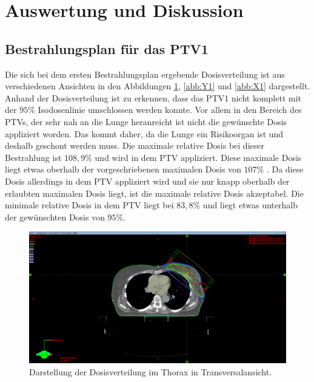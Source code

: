 \section{Auswertung und Diskussion}
\label{sec:Auswertung}

\subsection*{Bestrahlungsplan für das PTV1}

Die sich bei dem ersten Bestrahlungsplan ergebende Dosisverteilung ist aus verschiedenen
Ansichten in den Abbildungen \ref{abb:Z1}, \ref{abb:Y1} und \ref{abb:X1} dargestellt.
Anhand der Dosisverteilung ist zu erkennen, dass das PTV1 nicht komplett mit der $95\%$
Isodosenlinie umschlossen werden konnte. Vor allem in den Bereich des PTVs, der sehr nah an
die Lunge heranreicht ist nicht die gewünschte Dosis appliziert worden. Das kommt daher, da die
Lunge ein Risikoorgan ist und deshalb geschont werden muss. Die maximale relative Dosis
bei dieser Bestrahlung ist $108,9\%$ und wird in dem PTV appliziert. Diese maximale Dosis
liegt etwas oberhalb der vorgeschriebenen maximalen Dosis von $107\%$ \cite{ICRU}.
Da diese Dosis allerdings in dem PTV appliziert wird und sie nur knapp oberhalb der erlaubten maximalen
Dosis liegt, ist die maximale relative Dosis akzeptabel. Die minimale relative Dosis in dem PTV liegt bei
$83,8\%$ und liegt etwas unterhalb der gewünschten Dosis von $95\%$.

\begin{figure}[H]
  \centering
  \includegraphics[width=\textwidth]{Bilder/Mamma1_Z.png}
  \caption{Darstellung der Dosisverteilung im Thorax in Transversalansicht.}
  \label{abb:Z1}
\end{figure}

